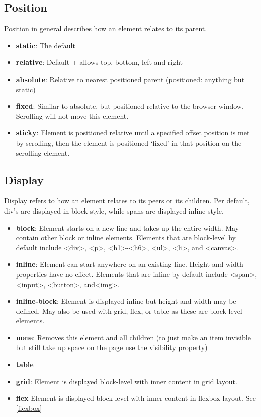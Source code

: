 \subsection{Position}
Position in general describes how an element relates to its parent.
\begin{itemize}
    \item \textbf{static}: The default
    \item \textbf{relative}: Default + allows top, bottom, left and right
    \item \textbf{absolute}: Relative to nearest positioned parent (positioned: anything but static)
    \item \textbf{fixed}: Similar to absolute, but positioned relative to the browser window. Scrolling will not move this element.
    \item \textbf{sticky}: Element is positioned relative until a specified offset position is met by scrolling, then the element is positioned ‘fixed’ in that position on the scrolling element.
\end{itemize}

\subsection{Display}
Display refers to how an element relates to its peers or its children.
Per default, div's are displayed in block-style, while spans are displayed inline-style.
\begin{itemize}
    \item \textbf{block}: Element starts on a new line and takes up the entire width.
            May contain other block or inline elements.
            Elements that are block-level by default include <div>, <p>, <h1>-<h6>, <ul>, <li>, and <canvas>.
    \item \textbf{inline}: Element can start anywhere on an existing line.
            Height and width properties have no effect.
            Elements that are inline by default include <span>, <input>, <button>, and<img>.
    \item \textbf{inline-block}: Element is displayed inline but height and width may be defined. May also be used with grid, flex, or table as these are block-level elements.
    \item \textbf{none}: Removes this element and all children (to just make an item invisible but still take up space on the page use the visibility property)
    \item \textbf{table}
    \item \textbf{grid}: Element is displayed block-level with inner content in grid layout.
    \item \textbf{flex} Element is displayed block-level with inner content in flexbox layout. See \ref{flexbox}
\end{itemize}

